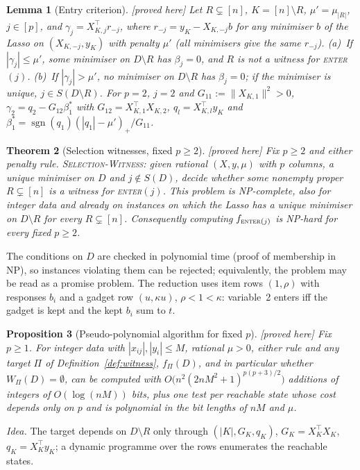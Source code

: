 \documentclass[10pt,a4paper]{article}
\theoremstyle{plain}
\newtheorem{theorem}{Theorem}[section]
\newtheorem{proposition}[theorem]{Proposition}
\newtheorem{lemma}[theorem]{Lemma}
\theoremstyle{definition}
\theoremstyle{remark}
\newcommand{\sgn}{\operatorname{sgn}}
\newcommand{\status}[1]{\textnormal{\textsf{\small [#1]}}}
\newcommand{\Dm}{D\setminus R}
\newcommand{\tsc}[1]{\textnormal{\textsc{#1}}}  %
\begin{document}
\begin{lemma}[Entry criterion]\label{lem:entry}\status{proved here}
Let $R\subsetneq[n]$, $K=[n]\setminus R$, $\mu'=\mu_{|R|}$, $j\in[p]$, and $\gamma_j=X_{K,j}^{\top}r_{-j}$, where $r_{-j}=y_K-X_{K,-j}b$ for any minimiser $b$ of the Lasso on $(X_{K,-j},y_K)$ with penalty $\mu'$ (all minimisers give the same $r_{-j}$). (a)~If $|\gamma_j|\le\mu'$, some minimiser on $\Dm$ has $\beta_j=0$, and $R$ is not a witness for \tsc{enter}$(j)$. (b)~If $|\gamma_j|>\mu'$, no minimiser on $\Dm$ has $\beta_j=0$; if the minimiser is unique, $j\in S(\Dm)$. For $p=2$, $j=2$ and $G_{11}:=\lVert X_{K,1}\rVert^2>0$, $\gamma_2=q_2-G_{12}\beta_1^\ast$ with $G_{12}=X_{K,1}^{\top}X_{K,2}$, $q_l=X_{K,l}^{\top}y_K$ and $\beta_1^\ast=\sgn(q_1)(|q_1|-\mu')_+/G_{11}$.
\end{lemma}

\begin{theorem}[Selection witnesses, fixed $p\ge2$]\label{thm:enter2}\status{proved here}
Fix $p\ge2$ and either penalty rule. \tsc{Selection-Witness}: given rational $(X,y,\mu)$ with $p$ columns, a unique minimiser on $D$ and $j\notin S(D)$, decide whether some nonempty proper $R\subsetneq[n]$ is a witness for \tsc{enter}$(j)$. This problem is NP-complete, also for integer data and already on instances on which the Lasso has a unique minimiser on $\Dm$ for every $R\subsetneq[n]$. Consequently computing $f_{\tsc{enter}(j)}$ is NP-hard for every fixed $p\ge2$.
\end{theorem}
\noindent The conditions on $D$ are checked in polynomial time (proof of membership in NP), so instances violating them can be rejected; equivalently, the problem may be read as a promise problem. The reduction uses item rows $(1,\rho)$ with responses $b_i$ and a gadget row $(u,\kappa u)$, $\rho<1<\kappa$: variable~2 enters iff the gadget is kept and the kept $b_i$ sum to $t$.

\begin{proposition}[Pseudo-polynomial algorithm for fixed $p$]\label{prop:pseudo}\status{proved here}
Fix $p\ge1$. For integer data with $|x_{ij}|,|y_i|\le M$, rational $\mu>0$, either rule and any target $\Pi$ of Definition~\ref{def:witness}, $f_\Pi(D)$, and in particular whether $W_\Pi(D)=\emptyset$, can be computed with $O\bigl(n^2(2nM^2+1)^{p(p+3)/2}\bigr)$ additions of integers of $O(\log(nM))$ bits, plus one test per reachable state whose cost depends only on $p$ and is polynomial in the bit lengths of $nM$ and $\mu$.
\end{proposition}
\noindent\emph{Idea.} The target depends on $\Dm$ only through $(|K|,G_K,q_K)$, $G_K=X_K^{\top}X_K$, $q_K=X_K^{\top}y_K$; a dynamic programme over the rows enumerates the reachable states.
\end{document}
